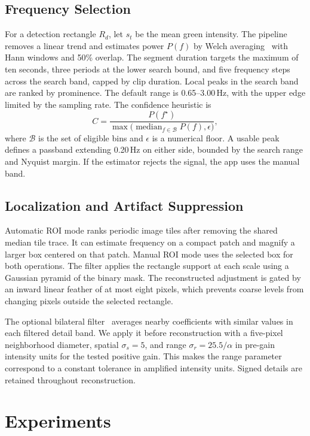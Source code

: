 \documentclass[10pt,twocolumn,letterpaper]{article}
\begin{document}
\subsection{Frequency Selection}
For a detection rectangle $R_d$, let $s_t$ be the mean green intensity.
The pipeline removes a linear trend and estimates power $P(f)$ by Welch
averaging~\cite{welch1967use} with Hann windows and 50\% overlap. The segment
duration targets the maximum of ten seconds, three periods at the lower
search bound, and five frequency steps across the search band, capped by
clip duration. Local peaks in the search band are ranked by prominence.
The default range is 0.65--3.00\,Hz, with the upper edge limited by the
sampling rate. The confidence heuristic is
\begin{equation}
  C = \frac{P(f^\star)}
  {\max\!\big(\operatorname{median}_{f \in \mathcal B} P(f),\epsilon\big)},
\end{equation}
where $\mathcal B$ is the set of eligible bins and $\epsilon$ is a numerical
floor. A usable peak defines a passband extending 0.20\,Hz on either side,
bounded by the search range and Nyquist margin. If the estimator rejects
the signal, the app uses the manual band.

\subsection{Localization and Artifact Suppression}
Automatic ROI mode ranks periodic image tiles after removing the shared
median tile trace. It can estimate frequency on a compact patch and
magnify a larger box centered on that patch. Manual ROI mode uses the
selected box for both operations. The filter applies the rectangle
support at each scale using a Gaussian pyramid of the binary mask.
The reconstructed adjustment is gated by an inward linear feather of
at most eight pixels, which prevents coarse levels from changing pixels
outside the selected rectangle.

The optional bilateral filter~\cite{tomasi1998bilateral} averages nearby
coefficients with similar values in each filtered detail band. We apply it
before reconstruction with a five-pixel neighborhood diameter, spatial
$\sigma_s=5$, and range $\sigma_r=25.5/\alpha$ in pre-gain intensity units
for the tested positive gain. This makes the range parameter correspond
to a constant tolerance in amplified intensity units. Signed details are
retained throughout reconstruction.

\section{Experiments}
\end{document}
